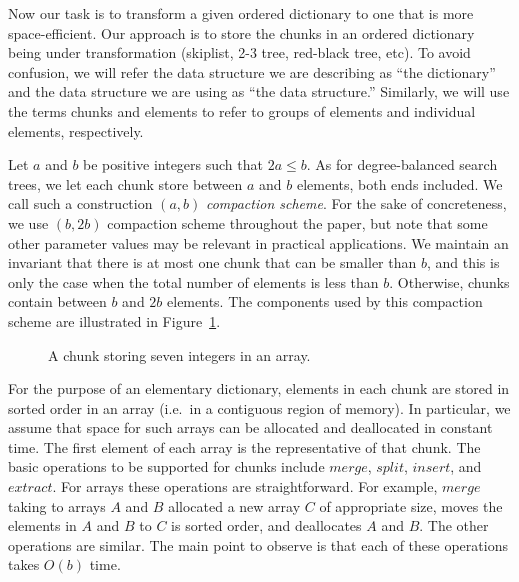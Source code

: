 \documentclass{DIKU-article}
\newcommand{\Insert}{\mbox{$\mathit{insert}$}}
\newcommand{\Extract}{\mbox{$\mathit{extract}$}}
\newcommand{\Merge}{\mbox{$\mathit{merge}$}}
\newcommand{\Split}{\mbox{$\mathit{split}$}}
\begin{document}
Now our task is to transform a given ordered dictionary to one that is
more space-efficient.  Our approach is to store the chunks in an
ordered dictionary being under transformation (skiplist, 2-3 tree,
red-black tree, etc).  To avoid confusion, we will refer the data
structure we are describing as ``the dictionary'' and the data
structure we are using as ``the data structure.''  Similarly, we will
use the terms chunks and elements to refer to groups of elements and
individual elements, respectively.

Let $a$ and $b$ be positive integers such that $2a \le b$.  As for
degree-balanced search trees, we let each chunk store between $a$ and
$b$ elements, both ends included. We call such a construction $(a,b)$
\emph{compaction scheme}. For the sake of concreteness, we use
$(b,2b)$ compaction scheme throughout the paper, but note that some
other parameter values may be relevant in practical applications.  We
maintain an invariant that there is at most one chunk that can be
smaller than $b$, and this is only the case when the total number of
elements is less than $b$. Otherwise, chunks contain between $b$ and
$2b$ elements.  The components used by this compaction scheme are
illustrated in Figure~\ref{fig:array}.

\begin{figure}
\begin{center}

\end{center}
\caption{A chunk storing seven integers in an array.\label{fig:array}}
\end{figure}

For the purpose of an elementary dictionary, elements in each
chunk are stored in sorted order in an array (i.e.~in a contiguous
region of memory). In particular, we assume that space for such arrays
can be allocated and deallocated in constant time. The first element
of each array is the representative of that chunk. The basic
operations to be supported for chunks include \Merge{}, \Split{},
\Insert{}, and \Extract{}. For arrays these operations are
straightforward. For example, \Merge{} taking to arrays $A$ and $B$
allocated a new array $C$ of appropriate size, moves the elements in
$A$ and $B$ to $C$ is sorted order, and deallocates $A$ and $B$. The
other operations are similar. The main point to observe is that each of
these operations takes $O(b)$ time.
\end{document}
